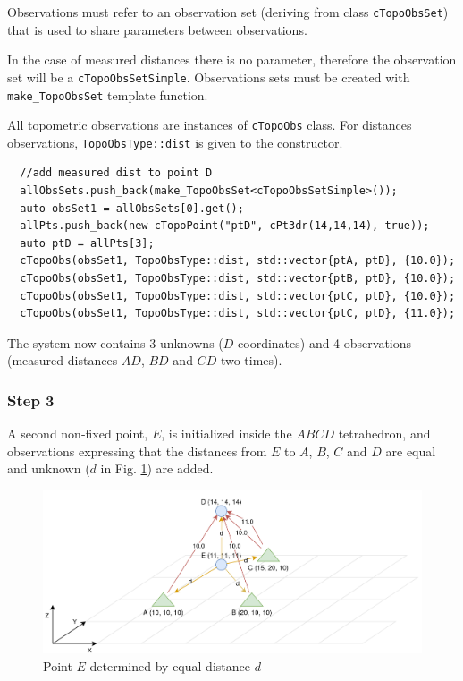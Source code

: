 Observations must refer to an observation set (deriving from class \texttt{cTopoObsSet})
that is used to share parameters between observations.

In the case of measured distances there is no parameter, therefore the observation set will be 
a \texttt{cTopoObsSetSimple}. Observations sets must be created with \texttt{make\_TopoObsSet} template function.

All topometric observations are instances of \texttt{cTopoObs} class.
For distances observations, \texttt{TopoObsType::dist} is given to the constructor.

\begin{lstlisting}
  //add measured dist to point D
  allObsSets.push_back(make_TopoObsSet<cTopoObsSetSimple>());
  auto obsSet1 = allObsSets[0].get();
  allPts.push_back(new cTopoPoint("ptD", cPt3dr(14,14,14), true));
  auto ptD = allPts[3];
  cTopoObs(obsSet1, TopoObsType::dist, std::vector{ptA, ptD}, {10.0});
  cTopoObs(obsSet1, TopoObsType::dist, std::vector{ptB, ptD}, {10.0});
  cTopoObs(obsSet1, TopoObsType::dist, std::vector{ptC, ptD}, {10.0});
  cTopoObs(obsSet1, TopoObsType::dist, std::vector{ptC, ptD}, {11.0});
\end{lstlisting}

The system now contains 3 unknowns ($D$ coordinates) and 4 observations
(measured distances $AD$, $BD$ and $CD$ two times).

\subsubsection{Step 3}

A second non-fixed point, $E$, is initialized inside the $ABCD$ tetrahedron,
and observations expressing that
the distances from $E$ to $A$, $B$, $C$ and $D$ are equal and unknown ($d$ in Fig. \ref{fig:topoEx3})
are added.

\begin{figure}[!h]
\centering
\includegraphics[width=12cm]{Programmer/benchtopo3.png}
\caption{Point $E$ determined by equal distance $d$}
\label{fig:topoEx3}
\end{figure}

